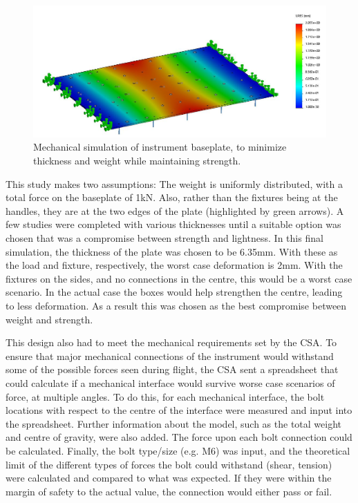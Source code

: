 \begin{figure}
    \centering
    \includegraphics[width=\textwidth]{chap3_images/mech_deformation.JPG}
    \caption{Mechanical simulation of instrument baseplate, to minimize thickness and weight while maintaining strength.}
    \label{fig:mech_sim}
\end{figure}

This study makes two assumptions: The weight is uniformly distributed, with a total force on the baseplate of 1kN. Also, rather than the fixtures being at the handles, they are at the two edges of the plate (highlighted by green arrows). A few studies were completed with various thicknesses until a suitable option was chosen that was a compromise between strength and lightness. In this final simulation, the thickness of the plate was chosen to be 6.35mm. With these as the load and fixture, respectively, the worst case deformation is 2mm. With the fixtures on the sides, and no connections in the centre, this would be a worst case scenario. In the actual case the boxes would help strengthen the centre, leading to less deformation. As a result this was chosen as the best compromise between weight and strength.

This design also had to meet the mechanical requirements set by the CSA. To ensure that major mechanical connections of the instrument would withstand some of the possible forces seen during flight, the CSA sent a spreadsheet that could calculate if a mechanical interface would survive worse case scenarios of force, at multiple angles. To do this, for each mechanical interface, the bolt locations with respect to the centre of the interface were measured and input into the spreadsheet. Further information about the model, such as the total weight and centre of gravity, were also added. The force upon each bolt connection could be calculated. Finally, the bolt type/size (e.g. M6) was input, and the theoretical limit of the different types of forces the bolt could withstand (shear, tension) were calculated and compared to what was expected. If they were within the margin of safety to the actual value, the connection would either pass or fail.

